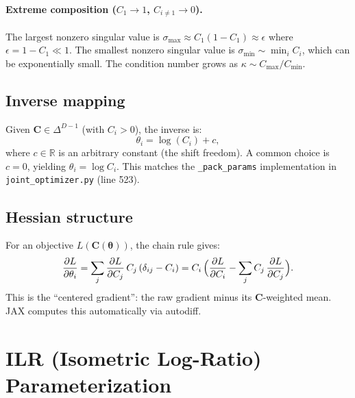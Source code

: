 \documentclass[11pt]{article}
\newcommand{\CC}{\mathbf{C}}
\newcommand{\ttheta}{\boldsymbol{\theta}}
\begin{document}
\paragraph{Extreme composition ($C_1 \to 1$, $C_{i\ne 1} \to 0$).}
The largest nonzero singular value is $\sigma_\mathrm{max} \approx C_1(1-C_1) \approx \epsilon$
where $\epsilon = 1 - C_1 \ll 1$.  The smallest nonzero singular value is
$\sigma_\mathrm{min} \sim \min_i C_i$, which can be exponentially small.
The condition number grows as $\kappa \sim C_\mathrm{max}/C_\mathrm{min}$.

\subsection{Inverse mapping}

Given $\CC \in \Delta^{D-1}$ (with $C_i > 0$), the inverse is:
%
\begin{equation}
  \label{eq:softmax-inverse}
  \theta_i = \log(C_i) + c,
\end{equation}
%
where $c \in \mathbb{R}$ is an arbitrary constant (the shift freedom).
A common choice is $c = 0$, yielding $\theta_i = \log C_i$.  This
matches the \texttt{\_pack\_params} implementation in
\texttt{joint\_optimizer.py} (line 523).

\subsection{Hessian structure}

For an objective $L(\CC(\ttheta))$, the chain rule gives:
%
\begin{equation}
  \frac{\partial L}{\partial \theta_i}
  = \sum_j \frac{\partial L}{\partial C_j}\,
    C_j\,(\delta_{ij} - C_i)
  = C_i\,\Bigl(\frac{\partial L}{\partial C_i}
    - \sum_j C_j\,\frac{\partial L}{\partial C_j}\Bigr).
  \label{eq:softmax-gradient}
\end{equation}
%
%
This is the ``centered gradient'': the raw gradient minus its
$\CC$-weighted mean.  JAX computes this automatically via autodiff.


\section{ILR (Isometric Log-Ratio) Parameterization}
\label{sec:ilr}
\end{document}
